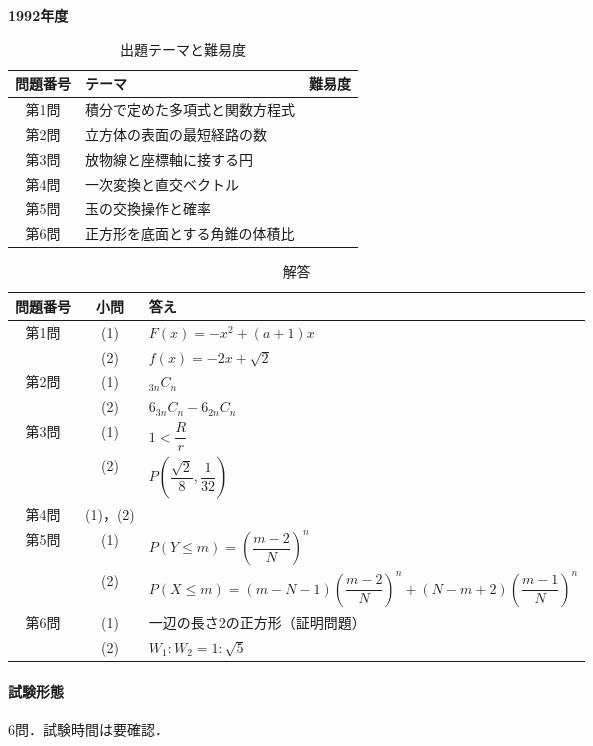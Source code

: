 \documentclass[../../main.tex]{subfiles}
\begin{document}
\begin{center}
  {\fontsize{48pt}{58pt}\selectfont \textbf{1992}\normalsize\textbf{年度}}
\end{center}

\begin{table}[htb]
  \centering
  \caption{出題テーマと難易度}
  \begin{tabular}{|c|p{9cm}|c|}
    \hline
    \textbf{問題番号} & \textbf{テーマ} & \textbf{難易度} \\
    \hline
    第1問 & 積分で定めた多項式と関数方程式 & \\
    \hline
    第2問 & 立方体の表面の最短経路の数 & \\
    \hline
    第3問 & 放物線と座標軸に接する円 & \\
    \hline
    第4問 & 一次変換と直交ベクトル & \\
    \hline
    第5問 & 玉の交換操作と確率 & \\
    \hline
    第6問 & 正方形を底面とする角錐の体積比 & \\
    \hline
  \end{tabular}
\end{table}

\begin{table}[htb]
  \centering
  \caption{解答}
  \renewcommand{\arraystretch}{1.4}
  \begin{tabular}{|c|c|p{9cm}|}
    \hline
    \textbf{問題番号} & \textbf{小問} & \textbf{答え} \\
    \hline
    第1問 & (1) & $F(x)=-x^2+(a+1)x$ \\
    \cline{2-3}
    & (2) & $f(x)=-2x+\sqrt{2}$ \\
    \hline
    第2問 & (1) & ${}_{3n}C_n$ \\
    \cline{2-3}
    & (2) & $6{}_{3n}C_n-6{}_{2n}C_n$ \\
    \hline
    第3問 & (1) & $1<\dfrac{R}{r}$ \\
    \cline{2-3}
    & (2) & $P\left(\dfrac{\sqrt{2}}{8},\dfrac{1}{32}\right)$ \\
    \hline
    第4問 & (1)，(2) &  \\
    \hline
    第5問 & (1) & $P(Y\le m)=\left(\dfrac{m-2}{N}\right)^n$ \\
    \cline{2-3}
    & (2) & $P(X\le m)=(m-N-1)\left(\dfrac{m-2}{N}\right)^n+(N-m+2)\left(\dfrac{m-1}{N}\right)^n$ \\
    \hline
    第6問 & (1) & 一辺の長さ$2$の正方形（証明問題） \\
    \cline{2-3}
    & (2) & $W_1:W_2=1:\sqrt{5}$ \\
    \hline
  \end{tabular}
\end{table}

\paragraph{試験形態}
6問．試験時間は要確認．
\end{document}
